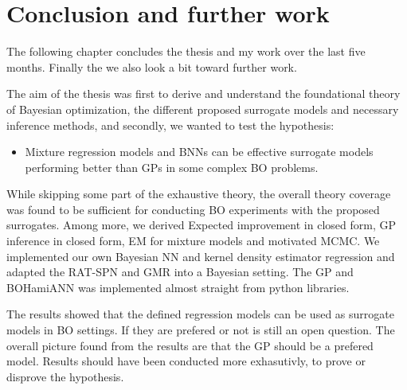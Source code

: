 \chapter{Conclusion and further work}
The following chapter concludes the thesis and my work over the last five months. Finally the 
we also look a bit toward further work. 

The aim of the thesis was first to derive and understand the foundational theory of Bayesian
optimization, the different proposed surrogate models and necessary inference methods, and secondly,
we wanted to test the hypothesis: 
\begin{itemize}
    \item Mixture regression models and BNNs can be effective surrogate models
    performing better than GPs in some complex BO problems. 
\end{itemize}

While skipping some part of the exhaustive theory, the overall theory coverage was found to be
sufficient for conducting BO experiments with the proposed surrogates. Among more, we derived
Expected improvement in closed form, GP inference in closed form, EM for mixture models and
motivated MCMC. We implemented our own Bayesian NN and kernel density estimator regression 
and adapted the RAT-SPN and GMR into a Bayesian setting. The GP and BOHamiANN was implemented
almost straight from python libraries. 

The results showed that the defined regression models can be used as surrogate models
in BO settings. If they are prefered or not is still an open question. The overall picture found
from the results are that the GP should be a prefered model. Results should have been conducted more
exhasutivly, to prove or disprove the hypothesis. 
 







